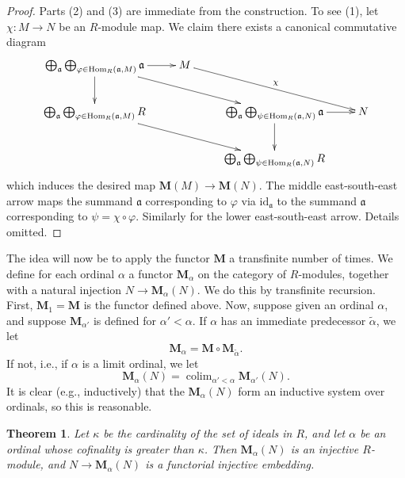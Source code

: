 \documentclass{stacks-project}
\theoremstyle{plain}
\newtheorem{theorem}[subsection]{Theorem}
\theoremstyle{definition}
\theoremstyle{remark}
\numberwithin{equation}{subsection}
\def\colim{\mathop{\mathrm{colim}}\nolimits}
\def\Hom{\mathop{\mathrm{Hom}}\nolimits}
\begin{document}
\begin{proof}
Parts (2) and (3) are immediate from the construction.
To see (1), let $\chi : M \to N$ be an $R$-module map. We claim there exists
a canonical commutative diagram
$$
\xymatrix{
\bigoplus_{\mathfrak a}
\bigoplus_{\varphi \in \Hom_R(\mathfrak a, M)}
\mathfrak{a} \ar[r] \ar[d] \ar[rrd] & M \ar[rrd]^\chi \\
\bigoplus_{\mathfrak a}
\bigoplus_{\varphi \in \Hom_R(\mathfrak a, M)}
R \ar[rrd] & &
\bigoplus_{\mathfrak a}
\bigoplus_{\psi \in \Hom_R(\mathfrak a, N)}
\mathfrak{a} \ar[r] \ar[d] & N \\
& & \bigoplus_{\mathfrak a}
\bigoplus_{\psi \in \Hom_R(\mathfrak a, N)}
R
}
$$
which induces the desired map $\mathbf{M}(M) \to \mathbf{M}(N)$.
The middle east-south-east arrow maps the summand $\mathfrak a$
corresponding to $\varphi$ via $\text{id}_{\mathfrak a}$ to the
summand $\mathfrak a$ corresponding to $\psi = \chi \circ \varphi$.
Similarly for the lower east-south-east arrow. Details omitted.
\end{proof}

\noindent
The idea will now be to apply the functor $\mathbf{M}$ a transfinite number
of times. We define for each ordinal $\alpha$ a functor $\mathbf{M}_\alpha$
on the category of $R$-modules, together with a natural injection $N \to
\mathbf{M}_\alpha(N)$. We do this by transfinite recursion.
First, $\mathbf{M}_1 = \mathbf{M}$ is the functor defined above.
Now, suppose given an ordinal $\alpha$, and suppose $\mathbf{M}_{\alpha'}$
is defined for $\alpha' < \alpha$. If $\alpha$ has an immediate predecessor
$\widetilde{\alpha}$, we let
$$
\mathbf{M}_\alpha = \mathbf{M} \circ \mathbf{M}_{\widetilde{\alpha}}.
$$
If not, i.e., if $\alpha$ is a limit ordinal, we let
$$
\mathbf{M}_{\alpha}(N) =
\colim_{\alpha' < \alpha} \mathbf{M}_{\alpha'}(N).
$$
It is clear (e.g., inductively) that the $\mathbf{M}_{\alpha}(N)$
form an inductive system over ordinals, so this is reasonable.

\begin{theorem}
\label{theorem-baer-grothendieck}
Let $\kappa$ be the cardinality of the set of ideals in $R$, and
let $\alpha$ be an ordinal whose cofinality is greater than
$\kappa$. Then $\mathbf{M}_\alpha(N)$ is an injective $R$-module,
and $N \to \mathbf{M}_\alpha(N)$ is a functorial injective embedding.
\end{theorem}
\end{document}
